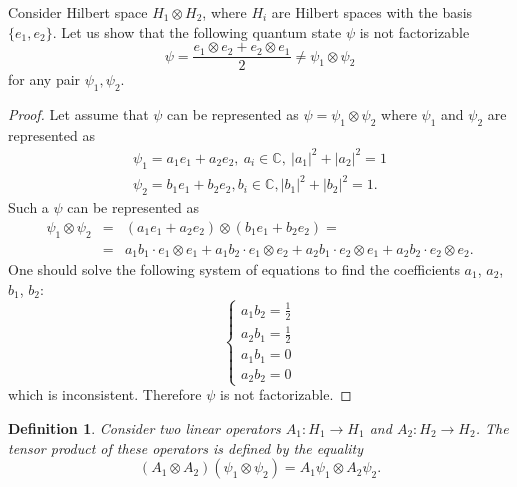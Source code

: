\documentclass[11pt]{article}
\newtheorem{definition}{Definition}[section]
\begin{document}
Consider Hilbert space $H_1\otimes H_2$, where $H_i$ are Hilbert spaces with the basis $\{e_1, e_2\}$. Let us show that the following quantum state $\psi$ is not factorizable
\[
	\psi = \frac{e_1 \otimes e_2 + e_2 \otimes e_1}{2} \ne \psi_1 \otimes \psi_2
\]
for any pair $\psi_1, \psi_2$.
\begin{proof}
Let assume that $\psi$ can be represented as $\psi = \psi_1\otimes\psi_2$ where
$\psi_1$ and $\psi_2$ are represented as
\begin{gather*}
	\psi_1 = a_1 e_1 + a_2 e_2,\ a_i\in \mathbb{C},\ |a_1|^2 + |a_2|^2 = 1 \\
	\psi_2 = b_1 e_1 + b_2 e_2, b_i\in \mathbb{C}, |b_1|^2 + |b_2|^2 = 1.
\end{gather*}
Such a $\psi$ can be represented as
\begin{eqnarray*}
	\psi_1 \otimes \psi_2 &=& (a_1 e_1 + a_2 e_2) \otimes (b_1 e_1 + b_2 e_2) = \\ &=&  
	a_1 b_1 \cdot e_1 \otimes e_1 + a_1 b_2 \cdot e_1 \otimes e_2 + 
	a_2 b_1 \cdot e_2 \otimes e_1 + a_2 b_2 \cdot e_2 \otimes e_2.
\end{eqnarray*}
One should solve the following system of equations to find the coefficients $a_1$, $a_2$, $b_1$, $b_2$:
$$
\begin{cases}
a_1 b_2 = \frac12 \\
a_2 b_1 = \frac12 \\
a_1 b_1 = 0 \\
a_2 b_2 = 0
\end{cases}
$$
which is inconsistent. Therefore $\psi$ is not factorizable.
\end{proof}
 
\begin{definition}
Consider two linear operators $A_1: H_1\to H_1$ and $A_2: H_2\to H_2$. The tensor product of these operators is defined by the equality
\[
(A_1\otimes A_2)(\psi_1\otimes \psi_2) = A_1\psi_1 \otimes A_2\psi_2.
\]
\end{definition}
\end{document}

